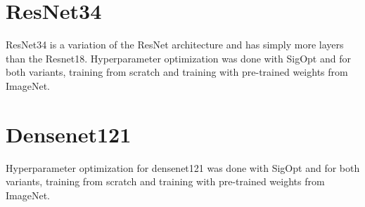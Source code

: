 \section{ResNet34}

ResNet34 is a variation of the ResNet architecture and has simply more layers than the Resnet18. Hyperparameter optimization was done with SigOpt and for both variants, training from scratch and training with pre-trained weights from ImageNet.

\begin{table}[h] \centering
{}
\caption{Hyper parameters for ResNet34 optimized with SigOpt. First row shows hyperparameters training the architecture from scratch. Second row used pre-trained weights from ImageNet}
\label{tbl:ResNet34}
\end{table}

















\section{Densenet121}

Hyperparameter optimization for densenet121 was done with SigOpt and for both variants, training from scratch and training with pre-trained weights from ImageNet.

\begin{table}[h] \centering
{}
\caption{Hyper parameters for densenet121 optimized with SigOpt. First row shows hyperparameters training the architecture from scratch. Second row used pre-trained weights from ImageNet}
\label{tbl:Densenet121}
\end{table}





